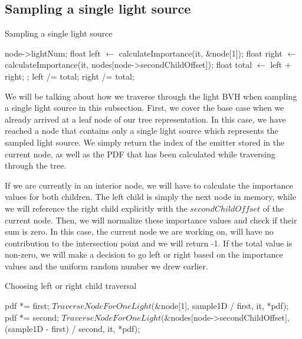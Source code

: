 \subsection{Sampling a single light source}
\label{subs:single}

\begin{algorithm}
	\caption{Sampling a single light source}
	\label{alg:sample1}
	\begin{algorithmic}[1] %
		\State \Return node->lightNum;
		\EndIf
		\State float left $\gets$ calculateImportance(it, \&node[1]);
		\State float right $\gets$ calculateImportance(it, nodes[node->secondChildOffset]);
		\State float total $\gets$ left + right;
		\State {};
		\EndIf
		\State left /= total;
		\State right /= total;
				\State <branch according to importance and sample1D>
		\EndProcedure
	\end{algorithmic}
\end{algorithm}

We will be talking about how we traverse through the light BVH when sampling a single light source in this subsection. First, we cover the base case when we already arrived at a leaf node of our tree representation. In this case, we have reached a node that contains only a single light source which represents the sampled light source. We simply return the index of the emitter stored in the current node, as well as the PDF that has been calculated while traversing through the tree.

If we are currently in an interior node, we will have to calculate the importance values for both children. The left child is simply the next node in memory, while we will reference the right child explicitly with the $secondChildOffset$ of the current node. Then, we will normalize these importance values and check if their sum is zero. In this case, the current node we are working on, will have no contribution to the intersection point and we will return -1. If the total value is non-zero, we will make a decision to go left or right based on the importance values and the uniform random number we drew earlier.

\begin{algorithm}
	\caption{Choosing left or right child traversal}
	\label{alg:child}
	\begin{algorithmic}[1] %
		\State *pdf *= first;
		\State \Return $TraverseNodeForOneLight$(\&node[1], sample1D / first, it, *pdf);
		\Else
		\State *pdf *= second;
		\State \Return $TraverseNodeForOneLight$(\&nodes[node->secondChildOffset], (sample1D - first) / second, it, *pdf);
		\EndIf
	\end{algorithmic}
\end{algorithm}

